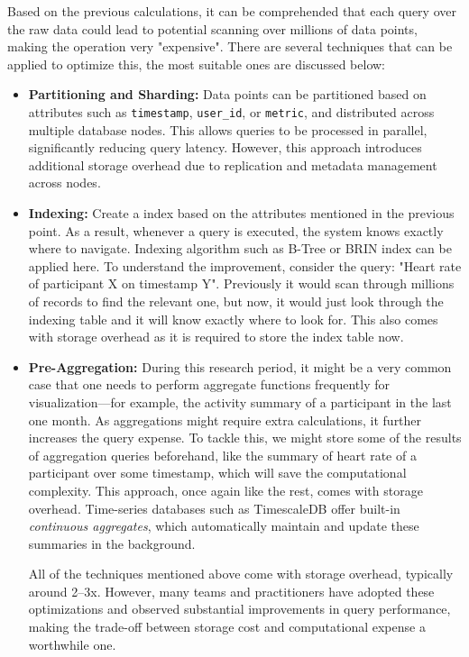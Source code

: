 \documentclass[a4paper, 12pt]{article}
\begin{document}
Based on the previous calculations, it can be comprehended that each query over the raw data could lead to potential scanning over millions of data points, making the operation very "expensive". There are several techniques that can be applied to optimize this, the most suitable ones are discussed below:

\begin{itemize}
    \item \textbf{Partitioning and Sharding:} Data points can be partitioned based on attributes such as \texttt{timestamp}, \texttt{user\_id}, or \texttt{metric}, and distributed across multiple database nodes. This allows queries to be processed in parallel, significantly reducing query latency. However, this approach introduces additional storage overhead due to replication and metadata management across nodes.

    \item \textbf{Indexing: }Create a index based on the attributes mentioned in the previous point. As a result, whenever a query is executed, the system knows exactly where to navigate. Indexing algorithm such as B-Tree or BRIN index can be applied here. To understand the improvement, consider the query: "Heart rate of participant X on timestamp Y". Previously it would scan through millions of records to find the relevant one, but now, it would just look through the indexing table and it will know exactly where to look for. This also comes with storage overhead as it is required to store the index table now.

   \item \textbf{Pre-Aggregation:} During this research period, it might be a very common case that one needs to perform aggregate functions frequently for visualization—for example, the activity summary of a participant in the last one month. As aggregations might require extra calculations, it further increases the query expense. To tackle this, we might store some of the results of aggregation queries beforehand, like the summary of heart rate of a participant over some timestamp, which will save the computational complexity. This approach, once again like the rest, comes with storage overhead. Time-series databases such as TimescaleDB offer built-in \textit{continuous aggregates}, which automatically maintain and update these summaries in the background.

    \vspace{1em}

    All of the techniques mentioned above come with storage overhead, typically around 2–3x. However, many teams and practitioners have adopted these optimizations and observed substantial improvements in query performance, making the trade-off between storage cost and computational expense a worthwhile one.

\end{itemize}
\end{document}
